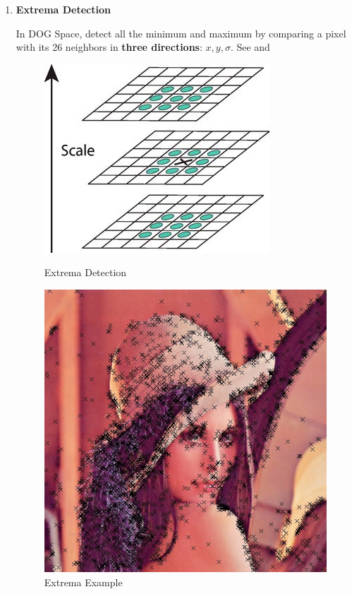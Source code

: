 \begin{enumerate}
  \item \textbf{Extrema Detection}

    In DOG Space, detect all the minimum and maximum
    by comparing a pixel with its 26 neighbors in \textbf{three directions}: $ x, y, \sigma$.
    See  and 
    \begin{figure}[H]
      \begin{minipage}[b]{0.46\linewidth}
        \centering
        \includegraphics[scale=0.4]{res/extrema.png}
        \caption{Extrema Detection\label{fig:extrema}}
      \end{minipage}
      \hspace{1em}
      \begin{minipage}[b]{0.46\linewidth}
        \centering
        \includegraphics[scale=0.35]{res/extrema_lenna.png}
        \caption{Extrema Example\label{fig:extrema2}}
      \end{minipage}
    \end{figure}


\end{enumerate}

